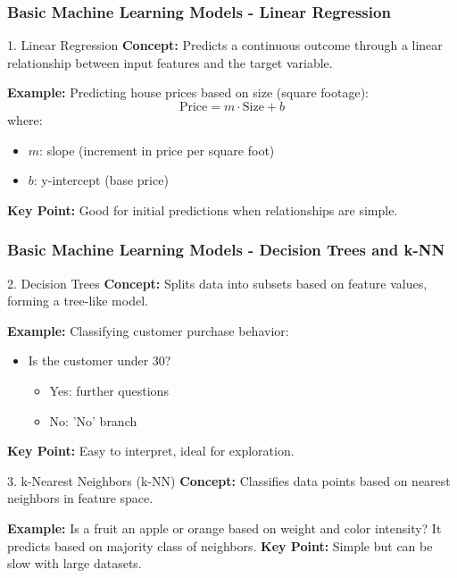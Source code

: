 \documentclass[aspectratio=169]{beamer}
\begin{document}
\begin{frame}[fragile]
    \frametitle{Basic Machine Learning Models - Linear Regression}
    \begin{block}{1. Linear Regression}
        \textbf{Concept:} Predicts a continuous outcome through a linear relationship between input features and the target variable.
    \end{block}
    \textbf{Example:} Predicting house prices based on size (square footage):
    \begin{equation}
        \text{Price} = m \cdot \text{Size} + b
    \end{equation}
    where:
    \begin{itemize}
        \item \( m \): slope (increment in price per square foot)
        \item \( b \): y-intercept (base price)
    \end{itemize}
    \textbf{Key Point:} Good for initial predictions when relationships are simple.
\end{frame}

\begin{frame}[fragile]
    \frametitle{Basic Machine Learning Models - Decision Trees and k-NN}
    \begin{block}{2. Decision Trees}
        \textbf{Concept:} Splits data into subsets based on feature values, forming a tree-like model.
    \end{block}
    \textbf{Example:} Classifying customer purchase behavior:
    \begin{itemize}
        \item Is the customer under 30?
        \begin{itemize}
            \item Yes: further questions
            \item No: 'No' branch
        \end{itemize}
    \end{itemize}
    \textbf{Key Point:} Easy to interpret, ideal for exploration.

    \begin{block}{3. k-Nearest Neighbors (k-NN)}
        \textbf{Concept:} Classifies data points based on nearest neighbors in feature space.
    \end{block}
    \textbf{Example:} Is a fruit an apple or orange based on weight and color intensity? It predicts based on majority class of neighbors.
    \textbf{Key Point:} Simple but can be slow with large datasets.
\end{frame}
\end{document}
